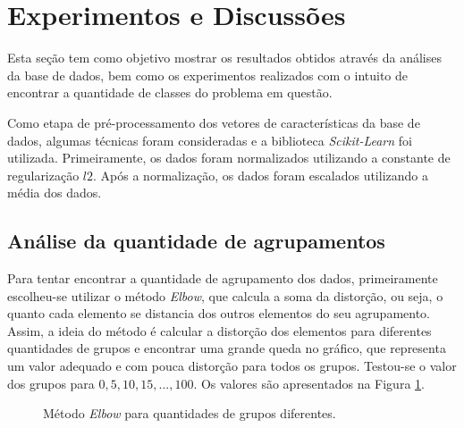 \documentclass[conference]{IEEEtran}
\begin{document}
\section{Experimentos e Discussões} \label{sec:exp}

Esta seção tem como objetivo mostrar os resultados obtidos através da análises da base de dados, bem como os experimentos realizados com o intuito de encontrar a quantidade de classes do problema em questão.

Como etapa de pré-processamento dos vetores de características da base de dados, algumas técnicas foram consideradas e a biblioteca \emph{Scikit-Learn} foi utilizada. Primeiramente, os dados foram normalizados utilizando a constante de regularização $l2$. Após a normalização, os dados foram escalados utilizando a média dos dados.

\subsection{Análise da quantidade de agrupamentos}

Para tentar encontrar a quantidade de agrupamento dos dados, primeiramente escolheu-se utilizar o método \emph{Elbow}, que calcula a soma da distorção, ou seja, o quanto cada elemento se distancia dos outros elementos do seu agrupamento. Assim, a ideia do método é calcular a distorção dos elementos para diferentes quantidades de grupos e encontrar uma grande queda no gráfico, que representa um valor adequado e com pouca distorção para todos os grupos. Testou-se o valor dos grupos para $0, 5, 10, 15, ..., 100$. Os valores são apresentados na Figura \ref{fig:elbow}.

\begin{figure}[!h]
	\centering
	{
	}
	\caption{\small Método \emph{Elbow} para quantidades de grupos diferentes.}
	\label{fig:elbow}
\end{figure}
\end{document}
